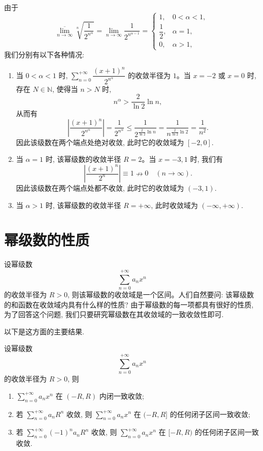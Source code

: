 \begin{solve}
由于
\[
  \overline{\lim_{n\to\infty}}\sqrt[n]{\frac1{2^{n^\alpha}}}
  =
  \lim_{n\to\infty}\frac1{2^{n^{\alpha-1}}}
  =
  \begin{cases}
    1, &0<\alpha<1,\\
    \dfrac12, &\alpha=1,\\
    0, &\alpha>1,
  \end{cases}
\]
我们分别有以下各种情况:
\begin{enumerate}
  \item 当 $0<\alpha<1$ 时, $\sum_{n=0}^{+\infty}\dfrac{(x+1)^n}{2^{n^\alpha}}$ 的收敛半径为 $1$。当 $x=-2$ 或 $x=0$ 时, 存在 $N\in\mathbb N$, 使得当 $n>N$ 时,
  \[
    n^\alpha>\frac2{\ln2}\ln n,
  \]
  从而有
  \[
    \left|\frac{(x+1)^n}{2^{n^\alpha}}\right|
    =
    \frac1{2^{n^\alpha}}
    \leqslant
    \frac1{2^{\frac2{\ln2}\ln n}}
    =
    \frac1{n^{\frac2{\ln2}\ln2}}
    =
    \frac1{n^2}.
  \]
  因此该级数在两个端点处绝对收敛, 此时它的收敛域为 $[-2,0]$.

  \item 当 $\alpha=1$ 时, 该幂级数的收敛半径 $R=2$。当 $x=-3,1$ 时, 我们有
  \[
    \left|\frac{(x+1)^n}{2^n}\right|\equiv1\nrightarrow0\quad(n\to\infty).
  \]
  因此该级数在两个端点处都不收敛, 此时它的收敛域为 $(-3,1)$.

  \item 当 $\alpha>1$ 时, 该幂级数的收敛半径 $R=+\infty$, 此时收敛域为 $(-\infty,+\infty)$.
\end{enumerate}
\end{solve}


\section{幂级数的性质}
\label{sec:ma-11-2}

设幂级数
\[
  \sum_{n=0}^{+\infty}a_nx^n
\]
的收敛半径为 $R>0$, 则该幂级数的收敛域是一个区间。人们自然要问: 该幂级数的和函数在收敛域内具有什么样的性质? 由于幂级数的每一项都具有很好的性质, 为了回答这个问题, 我们只要研究幂级数在其收敛域的一致收敛性即可.

以下是这方面的主要结果.

\begin{theorem}[{阿贝尔定理}]\label{theorem:ma-11-2-1}
设幂级数
\[
  \sum_{n=0}^{+\infty}a_nx^n
\]
的收敛半径为 $R>0$, 则
\begin{enumerate}
  \item $\sum_{n=0}^{+\infty}a_nx^n$ 在 $(-R,R)$ 内闭一致收敛;
  \item 若 $\sum_{n=0}^{+\infty}a_nR^n$ 收敛, 则 $\sum_{n=0}^{+\infty}a_nx^n$ 在 $(-R,R]$ 的任何闭子区间一致收敛;
  \item 若 $\sum_{n=0}^{+\infty}(-1)^na_nR^n$ 收敛, 则 $\sum_{n=0}^{+\infty}a_nx^n$ 在 $[-R,R)$ 的任何闭子区间一致收敛.
\end{enumerate}
\end{theorem}


